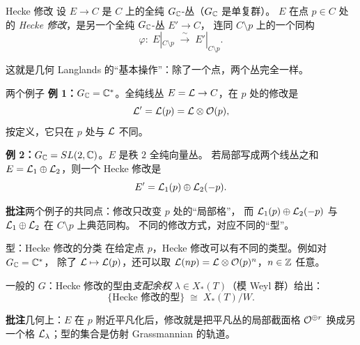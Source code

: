 \begin{frame}{Hecke 修改}
   设 $E\to C$ 是 $C$ 上的全纯 $G_{\mathbb{C}}$-丛（$G_{\mathbb{C}}$ 是单复群）。
  $E$ 在点 $p\in C$ 处的 \emph{Hecke 修改}，是另一个全纯 $G_{\mathbb{C}}$-丛 $E'\to C$，
  连同 $C\setminus p$ 上的一个同构
  \[
    \varphi:\;E|_{C\setminus p}\;\xrightarrow{\ \sim\ }\;E'|_{C\setminus p}.
  \]
  \begin{center}
  \end{center}
  这就是几何 Langlands 的“基本操作”：除了一个点，两个丛完全一样。
\end{frame}

\begin{frame}{两个例子}
  \textbf{例 1：$G_{\mathbb{C}}=\mathbb{C}^*$}。全纯线丛 $E=\mathcal{L}\to C$，在 $p$ 处的修改是
  \[
    \mathcal{L}'=\mathcal{L}(p)=\mathcal{L}\otimes\mathcal{O}(p),
  \]
  按定义，它只在 $p$ 处与 $\mathcal{L}$ 不同。
  \vspace{0.6em}

  \textbf{例 2：$G_{\mathbb{C}}=SL(2,\mathbb{C})$}。$E$ 是秩 $2$ 全纯向量丛。
  若局部写成两个线丛之和 $E=\mathcal{L}_1\oplus\mathcal{L}_2$，则一个 Hecke 修改是
  \[
    E'=\mathcal{L}_1(p)\oplus\mathcal{L}_2(-p).
  \]
  \begin{beizhu}
  \textbf{批注}\quad 两个例子的共同点：修改只改变 $p$ 处的“局部格”，
  而 $\mathcal{L}_1(p)\oplus\mathcal{L}_2(-p)$ 与 $\mathcal{L}_1\oplus\mathcal{L}_2$ 在 $C\setminus p$ 上典范同构。
  不同的修改方式，对应不同的“型”。
  \end{beizhu}
\end{frame}

\begin{frame}{型：Hecke 修改的分类}
   在给定点 $p$，Hecke 修改可以有不同的类型。例如对 $G_{\mathbb{C}}=\mathbb{C}^*$，
  除了 $\mathcal{L}\mapsto\mathcal{L}(p)$，还可以取 $\mathcal{L}(np)=\mathcal{L}\otimes\mathcal{O}(p)^n$，$n\in\mathbb{Z}$ 任意。
  \vspace{0.4em}

  一般的 $G$：Hecke 修改的型由\emph{支配余权} $\lambda\in X_*(T)$（模 Weyl 群）给出：
  \[
    \{\text{Hecke 修改的型}\}\;\cong\;X_*(T)/W .
  \]
  \begin{beizhu}
  \textbf{批注}\quad 几何上：$E$ 在 $p$ 附近平凡化后，修改就是把平凡丛的局部截面格
  $\mathcal{O}^{\oplus r}$ 换成另一个格 $\mathcal{L}_\lambda$；型的集合是仿射 Grassmannian 的轨道。
  \end{beizhu}
\end{frame}

